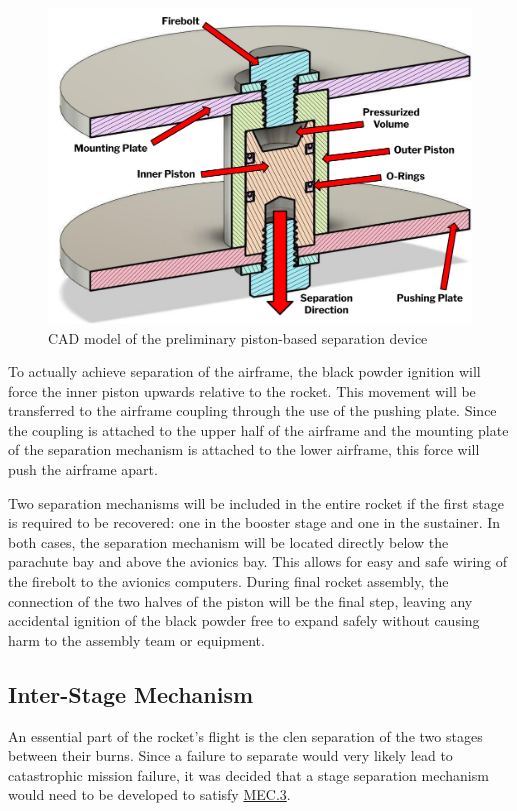 \begin{figure}
    \centering
    \includegraphics[width=0.8\linewidth]{images/sep-cad}
    \caption{CAD model of the preliminary piston-based separation device}
    \label{figure:sep-cad}
\end{figure}

To actually achieve separation of the airframe, the black powder ignition will force the inner piston upwards relative to the rocket. This movement will be transferred to the airframe coupling through the use of the pushing plate. Since the coupling is attached to the upper half of the airframe and the mounting plate of the separation mechanism is attached to the lower airframe, this force will push the airframe apart.

Two separation mechanisms will be included in the entire rocket if the first stage is required to be recovered: one in the booster stage and one in the sustainer. In both cases, the separation mechanism will be located directly below the parachute bay and above the avionics bay. This allows for easy and safe wiring of the firebolt to the avionics computers. During final rocket assembly, the connection of the two halves of the piston will be the final step, leaving any accidental ignition of the black powder free to expand safely without causing harm to the assembly team or equipment.


\subsection{Inter-Stage Mechanism} \label{section:interstage-mech}

An essential part of the rocket's flight is the clen separation of the two stages between their burns. Since a failure to separate would very likely lead to catastrophic mission failure, it was decided that a stage separation mechanism would need to be developed to satisfy \hyperlink{MEC.3}{MEC.3}.


